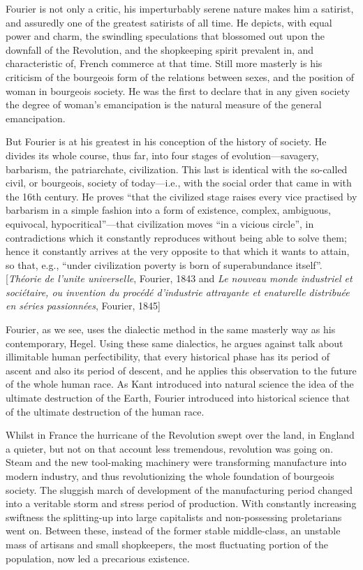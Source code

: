 Fourier is not only a critic, his imperturbably serene nature makes him a
satirist, and assuredly one of the greatest satirists of all time. He depicts,
with equal power and charm, the swindling speculations that blossomed out upon
the downfall of the Revolution, and the shopkeeping spirit prevalent in, and
characteristic of, French commerce at that time. Still more masterly is his
criticism of the bourgeois form of the relations between sexes, and the position
of woman in bourgeois society. He was the first to declare that in any given
society the degree of woman’s emancipation is the natural measure of the general
emancipation.

But Fourier is at his greatest in his conception of the history of society. He
divides its whole course, thus far, into four stages of evolution---savagery,
barbarism, the patriarchate, civilization. This last is identical with the
so-called civil, or bourgeois, society of today---i.e., with the social order
that came in with the 16th century. He proves ``that the civilized stage raises
every vice practised by barbarism in a simple fashion into a form of existence,
complex, ambiguous, equivocal, hypocritical''---that civilization moves ``in a
vicious circle'', in contradictions which it constantly reproduces without being
able to solve them; hence it constantly arrives at the very opposite to that
which it wants to attain, so that, e.g., ``under civilization poverty is born of
superabundance itself''. [\emph{Théorie de l’unite universelle}, Fourier, 1843
and \emph{Le nouveau monde industriel et sociétaire, ou invention du procédé
d'industrie attrayante et enaturelle distribuée en séries passionnées}, Fourier,
1845]

Fourier, as we see, uses the dialectic method in the same masterly way as his
contemporary, Hegel. Using these same dialectics, he argues against talk about
illimitable human perfectibility, that every historical phase has its period of
ascent and also its period of descent, and he applies this observation to the
future of the whole human race. As Kant introduced into natural science the idea
of the ultimate destruction of the Earth, Fourier introduced into historical
science that of the ultimate destruction of the human race.

Whilst in France the hurricane of the Revolution swept over the land, in England
a quieter, but not on that account less tremendous, revolution was going on.
Steam and the new tool-making machinery were transforming manufacture into
modern industry, and thus revolutionizing the whole foundation of bourgeois
society. The sluggish march of development of the manufacturing period changed
into a veritable storm and stress period of production. With constantly
increasing swiftness the splitting-up into large capitalists and non-possessing
proletarians went on. Between these, instead of the former stable middle-class,
an unstable mass of artisans and small shopkeepers, the most fluctuating portion
of the population, now led a precarious existence.

